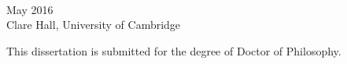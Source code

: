
\begin{titlepage}

\begin{addmargin}[-1cm]{-3cm}
\begin{center}
\large

\hfill
\vfill

\begingroup
\color{Maroon} \\ \bigskip
\endgroup


\vfill
\vspace{7em}

May 2016 \\
\medskip
Clare Hall, University of Cambridge

\vspace{2em}


{\small This dissertation is submitted for the degree of Doctor of Philosophy.}


\vfill

\end{center}
\end{addmargin}

\end{titlepage}
